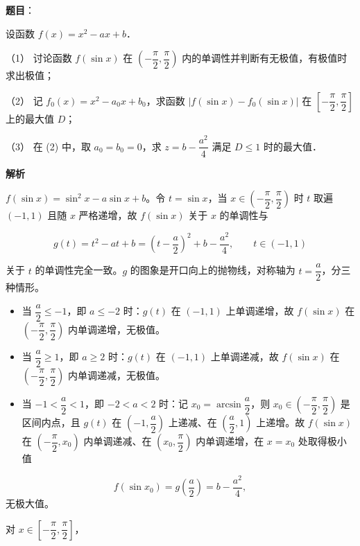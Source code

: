 \begin{answer}

\textbf{题目}：

设函数 \(f(x)=x^2-ax+b\)．

（1） 讨论函数 \(f(\sin x)\) 在 \(\left(-\dfrac{\pi}{2},\dfrac{\pi}{2}\right)\) 内的单调性并判断有无极值，有极值时求出极值；

（2） 记 \(f_0(x)=x^2-a_0x+b_0\)，求函数 \(|f(\sin x)-f_0(\sin x)|\) 在 \(\left[-\dfrac{\pi}{2},\dfrac{\pi}{2}\right]\) 上的最大值 \(D\)；

（3） 在 (2) 中，取 \(a_0=b_0=0\)，求 \(z=b-\dfrac{a^2}{4}\) 满足 \(D\leqslant 1\) 时的最大值．

\textbf{解析}


\(f(\sin x)=\sin^2 x-a\sin x+b\)。令 \(t=\sin x\)，当 \(x\in\left(-\dfrac{\pi}{2},\dfrac{\pi}{2}\right)\) 时 \(t\) 取遍 \((-1,1)\) 且随 \(x\) 严格递增，故 \(f(\sin x)\) 关于 \(x\) 的单调性与

\nopagebreak[4]
\[
g(t)=t^2-at+b=\left(t-\dfrac{a}{2}\right)^2+b-\dfrac{a^2}{4},\qquad t\in(-1,1)
\]

关于 \(t\) 的单调性完全一致。\(g\) 的图象是开口向上的抛物线，对称轴为 \(t=\dfrac{a}{2}\)，分三种情形。

\begin{itemize}
\item 当 \(\dfrac{a}{2}\leqslant -1\)，即 \(a\leqslant -2\) 时：\(g(t)\) 在 \((-1,1)\) 上单调递增，故 \(f(\sin x)\) 在 \(\left(-\dfrac{\pi}{2},\dfrac{\pi}{2}\right)\) 内单调递增，无极值。
\item 当 \(\dfrac{a}{2}\geqslant 1\)，即 \(a\geqslant 2\) 时：\(g(t)\) 在 \((-1,1)\) 上单调递减，故 \(f(\sin x)\) 在 \(\left(-\dfrac{\pi}{2},\dfrac{\pi}{2}\right)\) 内单调递减，无极值。
\item 当 \(-1<\dfrac{a}{2}<1\)，即 \(-2<a<2\) 时：记 \(x_0=\arcsin\dfrac{a}{2}\)，则 \(x_0\in\left(-\dfrac{\pi}{2},\dfrac{\pi}{2}\right)\) 是区间内点，且 \(g(t)\) 在 \(\left(-1,\dfrac{a}{2}\right)\) 上递减、在 \(\left(\dfrac{a}{2},1\right)\) 上递增。故 \(f(\sin x)\) 在 \(\left(-\dfrac{\pi}{2},x_0\right)\) 内单调递减、在 \(\left(x_0,\dfrac{\pi}{2}\right)\) 内单调递增，在 \(x=x_0\) 处取得极小值
\end{itemize}
\nopagebreak[4]
\[
  f(\sin x_0)=g\left(\dfrac{a}{2}\right)=b-\dfrac{a^2}{4},
\]
  无极大值。


对 \(x\in\left[-\dfrac{\pi}{2},\dfrac{\pi}{2}\right]\)，


\end{answer}
